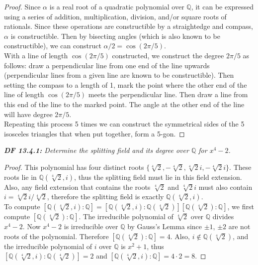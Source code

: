 \documentclass{article}
\begin{document}
  \begin{proof}
    Since $\alpha$ is a real root of a quadratic polynomial over $\mathbb{Q}$,
    it can be expressed using a series of addition, multiplication,
    division, and/or square roots of rationals. Since these operations are
    constructible by a straightedge and compass, $\alpha$ is constructible.
    Then by bisecting angles (which is also known to be constructible), we
    can construct $\alpha/2=\cos(2\pi/5)$. \\

    With a line of length $\cos(2\pi/5)$ constructed, we construct the
    degree $2\pi/5$ as follows: draw a perpendicular line from one end of
    the line upwards (perpendicular lines from a given line are known to be
    constructible). Then setting the compass to a length of 1, mark the
    point where the other end of the line of length $\cos(2\pi/5)$ meets
    the perpendicular line. Then draw a line from this end of the line to
    the marked point. The angle at the other end of the line will have
    degree $2\pi/5$. \\

    Repeating this process 5 times we can construct the symmetrical sides
    of the 5 isosceles triangles that when put together, form a 5-gon.
  \end{proof}

\it \textbf{DF 13.4.1:} Determine the splitting field and its degree over
  $\mathbb{Q}$ for $x^4-2$.

  \begin{proof}
    This polynomial has four distinct roots $\{\sqrt[4]{2}, -\sqrt[4]{2},
    \sqrt[4]{2}i, -\sqrt[4]{2}i\}$. These roots lie in
    $\mathbb{Q}(\sqrt[4]{2},i)$, thus the splitting field must lie in this
    field extension. Also, any field extension that contains the roots
    $\sqrt[4]{2}$ and $\sqrt[4]{2}i$ must also contain
    $i=\sqrt[4]{2}i/\sqrt[4]{2}$, therefore the splitting field is exactly
    $\mathbb{Q}(\sqrt[4]{2},i)$. \\

    To compute $[\mathbb{Q}(\sqrt[4]{2},i):\mathbb{Q}]
    =[\mathbb{Q}(\sqrt[4]{2},i):\mathbb{Q}(\sqrt[4]{2})]
    [\mathbb{Q}(\sqrt[4]{2}):\mathbb{Q}]$, we first compute
    $[\mathbb{Q}(\sqrt[4]{2}):\mathbb{Q}]$. The irreducible polynomial of
    $\sqrt[4]{2}$ over $\mathbb{Q}$ divides $x^4-2$. Now $x^4-2$ is
    irreducible over $\mathbb{Q}$ by Gauss's Lemma since $\pm1$, $\pm2$ are
    not roots of the polynomial. Therefore
    $[\mathbb{Q}(\sqrt[4]{2}):\mathbb{Q}]=4$. Also,
    $i\not\in\mathbb{Q}(\sqrt[4]{2})$, and the irreducible polynomial of
    $i$ over $\mathbb{Q}$ is $x^2+1$, thus
    $[\mathbb{Q}(\sqrt[4]{2},i):\mathbb{Q}(\sqrt[4]{2})]=2$ and
    $[\mathbb{Q}(\sqrt[4]{2},i):\mathbb{Q}]=4\cdot2=8$.
  \end{proof}
\end{document}
